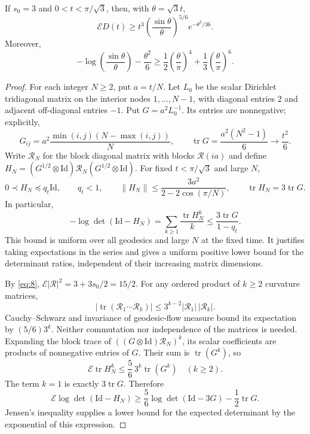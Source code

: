 \begin{lemma}\label{lem:lower-radial}
If $s_0=3$ and $0<t<\pi/\sqrt3$, then, with $\theta=\sqrt3t$,
\[
 \mathcal E D(t)\ge
 t^3\left(\frac{\sin\theta}{\theta}\right)^{5/6}
 e^{-\theta^2/36}.
\]
Moreover,
\[
 -\log\left(\frac{\sin\theta}{\theta}\right)-\frac{\theta^2}{6}
 \ge\frac12\left(\frac\theta\pi\right)^4
       +\frac13\left(\frac\theta\pi\right)^6.
\]
\end{lemma}
\begin{proof}
For each integer $N\ge2$, put $a=t/N$. Let $L_0$ be the scalar
Dirichlet tridiagonal matrix on the interior nodes $1,\ldots,N-1$,
with diagonal entries $2$ and adjacent off-diagonal entries $-1$.
Put $G=a^2L_0^{-1}$. Its entries are nonnegative; explicitly,
\[
 G_{ij}=a^2\frac{\min(i,j)(N-\max(i,j))}{N},\qquad
 \operatorname{tr}G=\frac{a^2(N^2-1)}6\longrightarrow\frac{t^2}{6}.
\]
Write $\mathcal R_N$ for the block diagonal matrix with blocks
$\mathcal R(ia)$ and define
$H_N=(G^{1/2}\otimes\mathrm{Id})\mathcal R_N
(G^{1/2}\otimes\mathrm{Id})$.
For fixed $t<\pi/\sqrt3$ and large $N$,
\[
 0\prec H_N\preceq q_t\mathrm{Id},\qquad q_t<1,
 \qquad
 \|H_N\|\le\frac{3a^2}{2-2\cos(\pi/N)},\qquad
 \operatorname{tr}H_N=3\operatorname{tr}G.
\]
In particular,
\[
 -\log\det(\mathrm{Id}-H_N)
 =\sum_{k\ge1}\frac{\operatorname{tr}H_N^k}{k}
 \le\frac{3\operatorname{tr}G}{1-q_t}.
\]
This bound is uniform over all geodesics and large $N$ at the fixed
time.  It justifies taking expectations in the series and gives a
uniform positive lower bound for the determinant ratios, independent
of their increasing matrix dimensions.

By \eqref{eq:8}, $\mathcal E|\mathcal R|^2=3+3s_0/2=15/2$.
For any ordered product of $k\ge2$ curvature matrices,
\[
 |\operatorname{tr}(\mathcal R_1\cdots\mathcal R_k)|
 \le3^{k-2}|\mathcal R_1|\,|\mathcal R_k|.
\]
Cauchy--Schwarz and invariance of geodesic-flow measure bound its
expectation by $(5/6)3^k$.  Neither commutation nor independence of the
matrices is needed.  Expanding the block trace of
$((G\otimes\mathrm{Id})\mathcal R_N)^k$, its scalar coefficients are
products of nonnegative entries of $G$.  Their sum is
$\operatorname{tr}(G^k)$, so
\[
 \mathcal E\operatorname{tr}H_N^k
 \le\frac56\,3^k\operatorname{tr}(G^k)\quad(k\ge2).
\]
The term $k=1$ is exactly $3\operatorname{tr}G$.  Therefore
\[
 \mathcal E\log\det(\mathrm{Id}-H_N)
 \ge\frac56\log\det(\mathrm{Id}-3G)-\frac12\operatorname{tr}G.
\]
Jensen's inequality supplies a lower bound for the expected determinant
by the exponential of this expression.


\end{proof}
